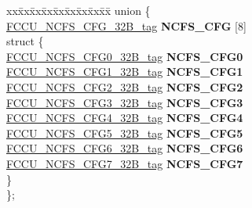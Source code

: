 \begin{DoxyCompactItemize}
\begin{tabbing}
\end{tabbing}\item 
\mbox{\label{structFCCU__struct__tag_abbb07fc74edd2f43fd825b3ec2b29ac7}} 
\begin{tabbing}
xx\=xx\=xx\=xx\=xx\=xx\=xx\=xx\=xx\=\kill
union \{\\
\>\mbox{\hyperlink{unionFCCU__NCFS__CFG__32B__tag}{FCCU\_NCFS\_CFG\_32B\_tag}} {\bfseries NCFS\_CFG} \mbox{[}8\mbox{]}\\
\mbox{\label{unionFCCU__struct__tag_1_1_0D2092_af1df952dc803871f3777b055be5939ec}} 
\>struct \{\\
\>\>\mbox{\hyperlink{unionFCCU__NCFS__CFG0__32B__tag}{FCCU\_NCFS\_CFG0\_32B\_tag}} {\bfseries NCFS\_CFG0}\\
\>\>\mbox{\hyperlink{unionFCCU__NCFS__CFG1__32B__tag}{FCCU\_NCFS\_CFG1\_32B\_tag}} {\bfseries NCFS\_CFG1}\\
\>\>\mbox{\hyperlink{unionFCCU__NCFS__CFG2__32B__tag}{FCCU\_NCFS\_CFG2\_32B\_tag}} {\bfseries NCFS\_CFG2}\\
\>\>\mbox{\hyperlink{unionFCCU__NCFS__CFG3__32B__tag}{FCCU\_NCFS\_CFG3\_32B\_tag}} {\bfseries NCFS\_CFG3}\\
\>\>\mbox{\hyperlink{unionFCCU__NCFS__CFG4__32B__tag}{FCCU\_NCFS\_CFG4\_32B\_tag}} {\bfseries NCFS\_CFG4}\\
\>\>\mbox{\hyperlink{unionFCCU__NCFS__CFG5__32B__tag}{FCCU\_NCFS\_CFG5\_32B\_tag}} {\bfseries NCFS\_CFG5}\\
\>\>\mbox{\hyperlink{unionFCCU__NCFS__CFG6__32B__tag}{FCCU\_NCFS\_CFG6\_32B\_tag}} {\bfseries NCFS\_CFG6}\\
\>\>\mbox{\hyperlink{unionFCCU__NCFS__CFG7__32B__tag}{FCCU\_NCFS\_CFG7\_32B\_tag}} {\bfseries NCFS\_CFG7}\\
\>\} \\
\}; \\


\end{tabbing}
\end{DoxyCompactItemize}
